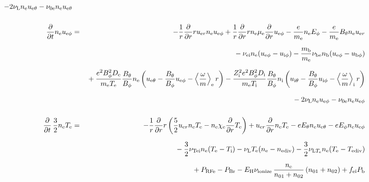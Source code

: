 \documentclass[11pt]{article}
\def\r#1{{\rm#1}}
\def\ddt{\frac{\partial}{\partial t}}
\def\ddr{\frac{\partial}{\partial r}}
\def\ave#1{\left\langle#1\right\rangle}
\def\me{m_\r{e}}
\def\mb{m_\r{b}}
\def\mue{\mu_\r{e}}
\def\mui{\mu_\r{i}}
\def\De{D_\r{e}}
\def\Di{D_\r{i}}
\def\chie{\chi_\r{e}}
\def\ne{n_\r{e}}
\def\ni{n_\r{i}}
\def\nb{n_\r{b}}
\def\uer{u_{\r{e}r}}
\def\ueth{u_{\r{e}\theta}}
\def\uith{u_{\r{i}\theta}}
\def\ueph{u_{\r{e}\phi}}
\def\uiph{u_{\r{i}\phi}}
\def\ubph{u_{\r{b}\phi}}
\def\Eth{E_\theta}
\def\Eph{E_\phi}
\def\Bth{B_\theta}
\def\Bph{B_\phi}
\def\Te{T_\r{e}}
\def\Ti{T_\r{i}}
\def\nna{n_{01}}
\def\nnb{n_{02}}
\def\Zi{Z_\r{i}}
\def\Pb{P_\r{b}}
\def\PRFe{P_\r{RFe}}
\def\PBr{P_\r{Br}}
\def\EH{E_\r{H}}
\def\fei{f_\r{ei}}
\def\nuei{\nu_\r{ei}}
\def\nube{\nu_\r{be}}
\def\nune{\nu_\r{0e}}
\def\nuL{\nu_\r{L}}
\def\nuion{\nu_\r{ionize}}
\def\nuTei{\nu_\r{Tei}}
\def\vb{v_\r{b}}
\def\nediv{n_\r{ediv}}
\def\Tediv{T_\r{ediv}}
\def\nuLTe{\nu_{\r{L}T_\r{e}}}
\newcommand{\Frac}[2]{%
  {\displaystyle {\displaystyle #1\over \displaystyle #2}}%
}
\newcommand{\rdprd}[2]{\Frac{\partial #1}{\partial #2}}
\newcommand{\aveaveB}[1]{\left< \!\! \left< #1 \right> \!\! \right>}
\begin{document}
\begin{eqnarray}
%
  - 2 \nuL \ne \ueth
%
  - \nune \ne \ueth
%
%
\\[5mm]
%
%
  \ddt \ne \ueph &=&
%
  - \frac{1}{r} \ddr r \uer \ne \ueph
%
  + \frac{1}{r} \ddr r \ne \mue \ddr \ueph
%
  - \frac{e}{\me} \ne \Eph
%
  - \frac{e}{\me} \Bth \ne \uer 
\nonumber\\[2.5mm]&&{}
%
  - \nuei \ne (\ueph - \uiph)
%
  - \frac{\mb}{\me} \nube \nb (\ueph - \ubph)
\nonumber\\[2.5mm]&&{}
%
  + \frac{e^2 \Bph^2 \De}{\me\Te}\frac{\Bth}{\Bph}\ne
    \left(\ueth - \frac{\Bth}{\Bph}\ueph - \ave{\frac{\omega}{m}}_\r{e}
     r \right)
%
  - \frac{\Zi^2 e^2 \Bph^2 \Di}{\me\Ti}\frac{\Bth}{\Bph}\ni
    \left(\uith - \frac{\Bth}{\Bph}\uiph - \ave{\frac{\omega}{m}}_\r{i}
     r \right)
\nonumber\\[2.5mm]&&{}
%
  - 2 \nuL \ne \ueph
%
  - \nune \ne \ueph
%
%
\\[5mm]
%
%
  \ddt \, \frac{3}{2} \ne \Te &=&
%
 - \frac{1}{r} \ddr r
   \left( \frac{5}{2} \uer \ne \Te - \ne \chie \ddr \Te \right)
%
  +  \uer \ddr \ne \Te
%
  -  e \Eth \ne \ueth
%
  -  e \Eph \ne \ueph 
\nonumber\\[2.5mm]&&{}
%
  - \frac{3}{2} \nuTei \ne (\Te - \Ti)
%
%
  - \nuL \Te (\ne - \nediv)
%
  - \frac{3}{2} \nuLTe \ne (\Te - \Tediv)
\nonumber\\[2.5mm]&&{}
%
  + \PRFe
%
  - \PBr
%
  - \EH \nuion\, \frac{\ne}{\nna+\nnb}\, (\nna+\nnb)
%
  + \fei \Pb
\\[5mm]

\end{eqnarray}
\end{document}
